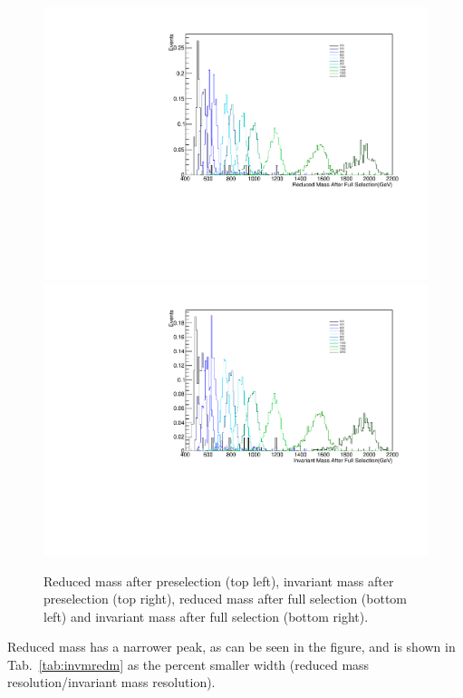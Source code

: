 \begin{figure}[h]
\begin{center}
\includegraphics[scale=0.34]{Figures/redmFS.pdf}
\includegraphics[scale=0.34]{Figures/invmFS.pdf}
\end{center}
\caption{Reduced mass after preselection (top left), invariant mass after preselection (top right), reduced mass after full selection (bottom left) and invariant mass after full selection (bottom right).}
\label{fig:invmredm}
\end{figure} 

Reduced mass has a narrower peak, as can be seen in the figure, and is shown in Tab.~\ref{tab:invmredm} as the percent smaller width (reduced mass resolution/invariant mass resolution).

